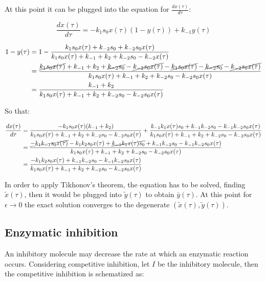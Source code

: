     At this point it can be plugged into the equation for $\frac{dx(\tau)}{d\tau}$:

    $$\frac{dx(\tau)}{d\tau} = -k_1s_0 x(\tau)(1-y(\tau)) + k_{-1} y(\tau)$$

    \begin{align*}
      1- y(\tau) &= 1 - \frac{k_1s_0x(\tau) + k_{-2}s_0 + k_{-2}s_0x(\tau)}{k_1s_0x(\tau)+k_{-1} + k_2 + k_{-2}s_0-k_{-2}x(\tau)}\\
                 &= \frac{\cancel{k_1s_0x(\tau)}+k_{-1} + k_2 + \cancel{k_{-2}s_0}-\cancel{k_{-2}s_0x(\tau)} - \cancel{k_1s_0x(\tau)} - \cancel{k_{-2}s_0} - \cancel{k_{-2}s_0x(\tau)}}{k_1s_0x(\tau)+k_{-1} + k_2 + k_{-2}s_0-k_{-2}s_0x(\tau)}\\
                 &= \frac{k_{-1} + k_2}{k_1s_0x(\tau)+k_{-1} + k_2 + k_{-2}s_0-k_{-2}s_0x(\tau)}\\
    \end{align*}

    So that:

    \begin{align*}
      \frac{dx(\tau)}{d\tau} &= \frac{-k_1s_0x(\tau)(k_{-1} + k_{2})}{k_1s_0x(\tau)+k_{-1} + k_2 + k_{-2}s_0-k_{-2}s_0x(\tau)} + \frac{k_{-1}k_1x(\tau)s_0 + k_{-1}k_{-2}s_0 - k_{-1}k_{-2}s_0x(\tau)}{k_1s_0x(\tau)+k_{-1} + k_2 + k_{-2}s_0-k_{-2}s_0x(\tau)}\\
                             &= \frac{\cancel{-k_1k_{-1}s_0x(\tau)}-k_1k_2s_0x(\tau) +\cancel{k_{-1}k_1x(\tau)s_0} + k_{-1}k_{-2}s_0 - k_{-1}k_{-2}s_0x(\tau)}{k_1s_0x(\tau)+k_{-1} + k_2 + k_{-2}s_0-k_{-2}s_0x(\tau)}\\
                             &= \frac{-k_1k_2s_0x(\tau) + k_{-1}k_{-2}s_0 - k_{-1}k_{-2}s_0x(\tau)}{k_1s_0x(\tau)+k_{-1} + k_2 + k_{-2}s_0-k_{-2}s_0x(\tau)}\\
    \end{align*}

    In order to apply Tikhonov's theorem, the equation has to be solved, finding $\tilde{x}(\tau)$, then it would be plugged into $\tilde{y}(\tau)$ to obtain $\bar{y}(\tau)$.
    At this point for $\epsilon\to 0$ the exact solution converges to the degenerate $(\tilde{x}(\tau), \tilde{y}(\tau))$.

  \subsection{Enzymatic inhibition}
  An inhibitory molecule may decrease the rate at which an enzymatic reaction occurs.
  Considering competitive inhibition, let $I$ be the inhibitory molecule, then the competitive inhibition is schematized as:

